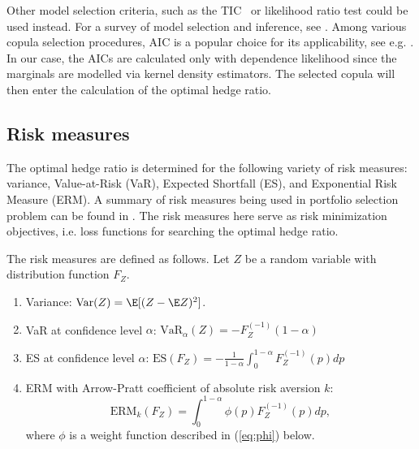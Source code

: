 Other model selection criteria, such as the TIC~\citep{takeuchi1976distribution} or likelihood ratio test could be used instead.
For a survey of model selection and inference, see \cite{anderson1998comparison}.
Among various copula selection procedures, AIC is a popular choice for
its applicability, see e.g. \cite{breymann2003dependence}.
In our case, the AICs are calculated only with dependence likelihood
since the marginals are modelled via kernel density estimators.
The selected copula will then enter the calculation of the optimal
hedge ratio.

\subsection{Risk measures}\label{subsec:spectral-risk-measures}
The optimal hedge ratio is determined for the following variety of risk measures: variance, Value-at-Risk (VaR), Expected Shortfall (ES), and Exponential Risk Measure (ERM).
A summary of risk measures being used in portfolio selection problem
can be found in \citet{hardle2008applied}. 
The risk measures here serve as risk minimization objectives, i.e. loss functions for searching the optimal hedge ratio. 

The risk measures are defined as follows.
Let $Z$ be a random
variable with distribution function $F_Z$.
\begin{enumerate}
\item Variance: $\text{Var}(Z) = \E[(Z-\E Z)^2]$. 
\item VaR at confidence level $\alpha$: $\text{VaR}_\alpha(Z) = -F_{Z}^{(-1)}(1-\alpha)$
\item ES at confidence level $\alpha$: $\text{ES}(F_Z) = -\frac{1}{1-\alpha}\int_0^{1-\alpha}F_Z^{(-1)}(p)dp$
\item ERM with Arrow-Pratt coefficient of absolute risk
  aversion $k$:
  \begin{equation*}
    \text{ERM}_k(F_Z) = \int_0^{1-\alpha}\phi(p) F_Z^{(-1)}(p)dp,
  \end{equation*}
  where $\phi$ is a weight function described in (\ref{eq:phi}) below.
\end{enumerate}

